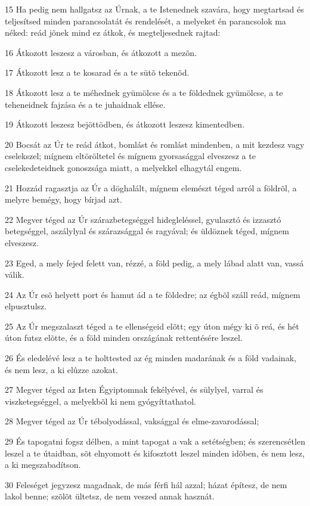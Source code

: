 \par 15 Ha pedig nem hallgatsz az Úrnak, a te Istenednek szavára, hogy megtartsad és teljesítsed minden parancsolatát és rendelését, a melyeket én parancsolok ma néked: reád jõnek mind ez átkok, és megteljesednek rajtad:
\par 16 Átkozott leszesz a városban, és átkozott a mezõn.
\par 17 Átkozott lesz a te kosarad és a te sütõ tekenõd.
\par 18 Átkozott lesz a te méhednek gyümölcse és a te földednek gyümölcse, a te teheneidnek fajzása és a te juhaidnak ellése.
\par 19 Átkozott leszesz bejöttödben, és átkozott leszesz kimentedben.
\par 20 Bocsát az Úr te reád átkot, bomlást és romlást mindenben, a mit kezdesz vagy cselekszel; mígnem eltöröltetel és mígnem gyorsasággal elveszesz a te cselekedeteidnek gonoszsága miatt, a melyekkel elhagytál engem.
\par 21 Hozzád ragasztja az Úr a döghalált, mígnem elemészt téged arról a földrõl, a melyre bemégy, hogy bírjad azt.
\par 22 Megver téged az Úr szárazbetegséggel hidegleléssel, gyulasztó és izzasztó betegséggel, aszálylyal és szárazsággal és ragyával; és üldöznek téged, mígnem elveszesz.
\par 23 Eged, a mely fejed felett van, rézzé, a föld pedig, a mely lábad alatt van, vassá válik.
\par 24 Az Úr esõ helyett port és hamut ád a te földedre; az égbõl száll reád, mígnem elpusztulsz.
\par 25 Az Úr megszalaszt téged a te ellenségeid elõtt; egy úton mégy ki õ reá, és hét úton futsz elõtte, és a föld minden országának rettentésére leszel.
\par 26 És eledelévé lesz a te holttested az ég minden madarának és a föld vadainak, és nem lesz, a ki elûzze azokat.
\par 27 Megver téged az Isten Égyiptomnak fekélyével, és sülylyel, varral és viszketegséggel, a melyekbõl ki nem gyógyíttathatol.
\par 28 Megver téged az Úr tébolyodással, vaksággal és elme-zavarodással;
\par 29 És tapogatni fogsz délben, a mint tapogat a vak a setétségben; és szerencsétlen leszel a te útaidban, sõt elnyomott és kifosztott leszel minden idõben, és nem lesz, a ki megszabadítson.
\par 30 Feleséget jegyzesz magadnak, de más férfi hál azzal; házat építesz, de nem lakol benne; szõlõt ültetsz, de nem veszed annak hasznát.
